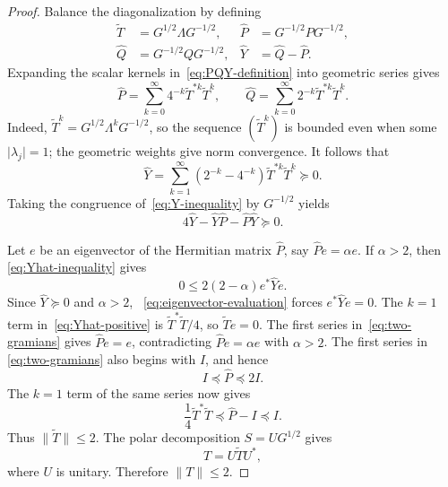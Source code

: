 \documentclass[preprints,article,submit,oneauthor]{Definitions/mdpi}
\theoremstyle{mdpi}
\theoremstyle{definition}
\begin{document}
\begin{proof}
Balance the diagonalization by defining
\begin{equation}
\begin{aligned}
  \widetilde T&=G^{1/2}\Lambda G^{-1/2},
  &\widehat P&=G^{-1/2}PG^{-1/2},\\
  \widehat Q&=G^{-1/2}QG^{-1/2},
  &\widehat Y&=\widehat Q-\widehat P.
\end{aligned}
\label{eq:balanced-definitions}
\end{equation}
Expanding the scalar kernels in~\eqref{eq:PQY-definition} into
geometric series gives
\begin{equation}
  \widehat P=\sum_{k=0}^{\infty}
  4^{-k}\widetilde T^{*k}\widetilde T^k,
  \qquad
  \widehat Q=\sum_{k=0}^{\infty}
  2^{-k}\widetilde T^{*k}\widetilde T^k.
  \label{eq:two-gramians}
\end{equation}
Indeed, $\widetilde T^k=G^{1/2}\Lambda^k G^{-1/2}$, so the sequence
$(\widetilde T^k)$ is bounded even when some
$\lvert\lambda_j\rvert=1$; the
geometric weights give norm convergence.  It follows that
\begin{equation}
  \widehat Y=
  \sum_{k=1}^{\infty}(2^{-k}-4^{-k})
  \widetilde T^{*k}\widetilde T^k\succeq0.
  \label{eq:Yhat-positive}
\end{equation}
Taking the congruence of~\eqref{eq:Y-inequality} by $G^{-1/2}$ yields
\begin{equation}
  4\widehat Y-\widehat Y\widehat P
  -\widehat P\widehat Y\succeq0.
  \label{eq:Yhat-inequality}
\end{equation}

Let $e$ be an eigenvector of the Hermitian matrix $\widehat P$, say
$\widehat Pe=\alpha e$.  If $\alpha>2$, then~%
\eqref{eq:Yhat-inequality} gives
\begin{equation}
  0\leq2(2-\alpha)e^*\widehat Ye.
  \label{eq:eigenvector-evaluation}
\end{equation}
Since $\widehat Y\succeq0$ and $\alpha>2$,~%
\eqref{eq:eigenvector-evaluation} forces $e^*\widehat Ye=0$.  The
$k=1$ term in~\eqref{eq:Yhat-positive} is
$\widetilde T^*\widetilde T/4$, so $\widetilde Te=0$.  The first
series in~\eqref{eq:two-gramians} gives $\widehat Pe=e$, contradicting
$\widehat Pe=\alpha e$ with $\alpha>2$.  The first series in~%
\eqref{eq:two-gramians} also begins with $I$, and hence
\begin{equation}
  I\preceq\widehat P\preceq2I.
  \label{eq:Phat-bounds}
\end{equation}
The $k=1$ term of the same series now gives
\[
  \frac14\widetilde T^*\widetilde T
  \preceq\widehat P-I\preceq I.
\]
Thus $\lVert\widetilde T\rVert\leq2$.  The polar decomposition
$S=UG^{1/2}$ gives
\[
  T=U\widetilde TU^*,
\]
where $U$ is unitary.  Therefore $\lVert T\rVert\leq2$.
\end{proof}
\end{document}
